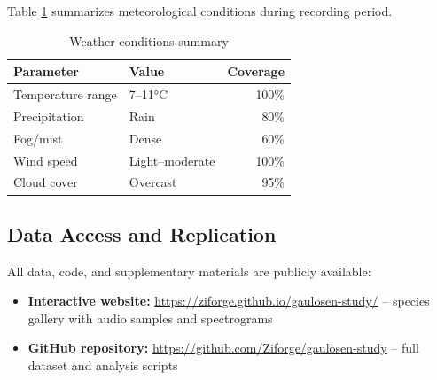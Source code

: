 \documentclass[twocolumn]{article}
\begin{document}
Table \ref{tab:weather} summarizes meteorological conditions during recording period.

\begin{table}[H]
\centering
\caption{Weather conditions summary}
\label{tab:weather}
\begin{tabular}{llr}
\toprule
\textbf{Parameter} & \textbf{Value} & \textbf{Coverage} \\
\midrule
Temperature range & 7--11°C & 100\% \\
Precipitation & Rain & 80\% \\
Fog/mist & Dense & 60\% \\
Wind speed & Light--moderate & 100\% \\
Cloud cover & Overcast & 95\% \\
\bottomrule
\end{tabular}
\end{table}

\subsection{Data Access and Replication}

All data, code, and supplementary materials are publicly available:

\begin{itemize}
\item \textbf{Interactive website:} \url{https://ziforge.github.io/gaulosen-study/} -- species gallery with audio samples and spectrograms
\item \textbf{GitHub repository:} \url{https://github.com/Ziforge/gaulosen-study} -- full dataset and analysis scripts
\end{itemize}



\end{document}
